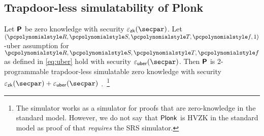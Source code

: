 
\subsection{Trapdoor-less simulatability of Plonk}
\begin{lemma}
  \label{lem:plonk_hvzk}
  Let $\bm{\mathsf{P}}$ be zero knowledge with security $\epszk(\secpar)$. Let
  $(\pR, \pS, \pT, \pf, 1)$-uber assumption for $\pR, \pS, \pT, \pf$ as defined in
  \cref{eq:uber} hold with security $\epsuber(\secpar)$. Then $\bm{\mathsf{P}}$
  is 2-programmable trapdoor-less simulatable zero knowledge 
  with security
  $\epszk(\secpar) + \epsuber(\secpar)$ .~\footnote{The simulator works as a simulator
    for proofs that are zero-knowledge in the standard model. However, we do not say
    that $\textnormal{\textsf{Plonk}}$ is HVZK in the standard model as proof of that \emph{requires} the
    SRS simulator.}
\end{lemma}

